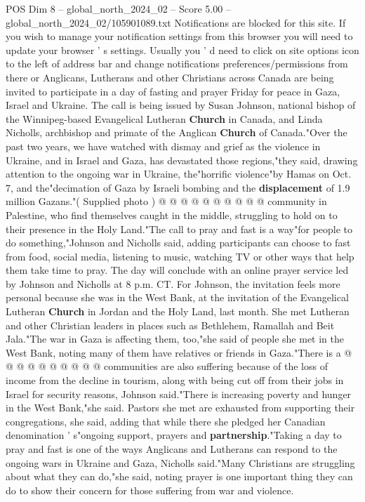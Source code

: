 \begin{textsample}{POS Dim 8 – global\_north\_2024\_02 – Score 5.00 – global\_north\_2024\_02/105901089.txt}  \label{ex:f8_pos_211}
Notifications are blocked for this site.
If you wish to manage your notification settings from this browser you will need to update your browser ' s settings.
Usually you ' d need to click on site options icon to the left of address bar and change notifications preferences/permissions from there or Anglicans, Lutherans and other Christians across Canada are being invited to participate in a day of fasting and prayer Friday for peace in Gaza, Israel and Ukraine.
The call is being issued by Susan Johnson, national bishop of the Winnipeg-based Evangelical Lutheran \textbf{Church} in Canada, and Linda Nicholls, archbishop and primate of the Anglican \textbf{Church} of Canada."Over the past two years, we have watched with dismay and grief as the violence in Ukraine, and in Israel and Gaza, has devastated those regions,"they said, drawing attention to the ongoing war in Ukraine, the"horrific violence"by Hamas on Oct. 7, and the"decimation of Gaza by Israeli bombing and the \textbf{displacement} of 1.9 million Gazans."( Supplied photo ) @ @ @ @ @ @ @ @ @ @ community in Palestine, who find themselves caught in the middle, struggling to hold on to their presence in the Holy Land."The call to pray and fast is a way"for people to do something,"Johnson and Nicholls said, adding participants can choose to fast from food, social media, listening to music, watching TV or other ways that help them take time to pray.
The day will conclude with an online prayer service led by Johnson and Nicholls at 8 p.m.
CT.
For Johnson, the invitation feels more personal because she was in the West Bank, at the invitation of the Evangelical Lutheran \textbf{Church} in Jordan and the Holy Land, last month.
She met Lutheran and other Christian leaders in places such as Bethlehem, Ramallah and Beit Jala."The war in Gaza is affecting them, too,"she said of people she met in the West Bank, noting many of them have relatives or friends in Gaza."There is a @ @ @ @ @ @ @ @ @ @ communities are also suffering because of the loss of income from the decline in tourism, along with being cut off from their jobs in Israel for security reasons, Johnson said."There is increasing poverty and hunger in the West Bank,"she said.
Pastors she met are exhausted from supporting their congregations, she said, adding that while there she pledged her Canadian denomination ' s"ongoing support, prayers and \textbf{partnership}."Taking a day to pray and fast is one of the ways Anglicans and Lutherans can respond to the ongoing wars in Ukraine and Gaza, Nicholls said."Many Christians are struggling about what they can do,"she said, noting prayer is one important thing they can do to show their concern for those suffering from war and violence.

\end{textsample}
